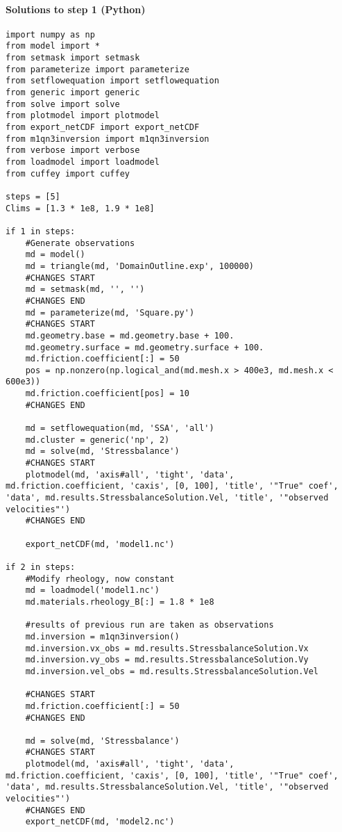 \paragraph{Solutions to step 1 (Python)}
\begin{lstlisting}
import numpy as np
from model import *
from setmask import setmask
from parameterize import parameterize
from setflowequation import setflowequation
from generic import generic
from solve import solve
from plotmodel import plotmodel
from export_netCDF import export_netCDF
from m1qn3inversion import m1qn3inversion
from verbose import verbose
from loadmodel import loadmodel
from cuffey import cuffey

steps = [5]
Clims = [1.3 * 1e8, 1.9 * 1e8]

if 1 in steps:
    #Generate observations
    md = model()
    md = triangle(md, 'DomainOutline.exp', 100000)
    #CHANGES START
    md = setmask(md, '', '')
    #CHANGES END
    md = parameterize(md, 'Square.py')
    #CHANGES START
    md.geometry.base = md.geometry.base + 100.
    md.geometry.surface = md.geometry.surface + 100.
    md.friction.coefficient[:] = 50
    pos = np.nonzero(np.logical_and(md.mesh.x > 400e3, md.mesh.x < 600e3))
    md.friction.coefficient[pos] = 10
    #CHANGES END

    md = setflowequation(md, 'SSA', 'all')
    md.cluster = generic('np', 2)
    md = solve(md, 'Stressbalance')
    #CHANGES START
    plotmodel(md, 'axis#all', 'tight', 'data', md.friction.coefficient, 'caxis', [0, 100], 'title', '"True" coef', 'data', md.results.StressbalanceSolution.Vel, 'title', '"observed velocities"')
    #CHANGES END

    export_netCDF(md, 'model1.nc')

if 2 in steps:
    #Modify rheology, now constant
    md = loadmodel('model1.nc')
    md.materials.rheology_B[:] = 1.8 * 1e8

    #results of previous run are taken as observations
    md.inversion = m1qn3inversion()
    md.inversion.vx_obs = md.results.StressbalanceSolution.Vx
    md.inversion.vy_obs = md.results.StressbalanceSolution.Vy
    md.inversion.vel_obs = md.results.StressbalanceSolution.Vel

    #CHANGES START
    md.friction.coefficient[:] = 50
    #CHANGES END

    md = solve(md, 'Stressbalance')
    #CHANGES START
    plotmodel(md, 'axis#all', 'tight', 'data', md.friction.coefficient, 'caxis', [0, 100], 'title', '"True" coef', 'data', md.results.StressbalanceSolution.Vel, 'title', '"observed velocities"')
    #CHANGES END
    export_netCDF(md, 'model2.nc')


\end{lstlisting}
